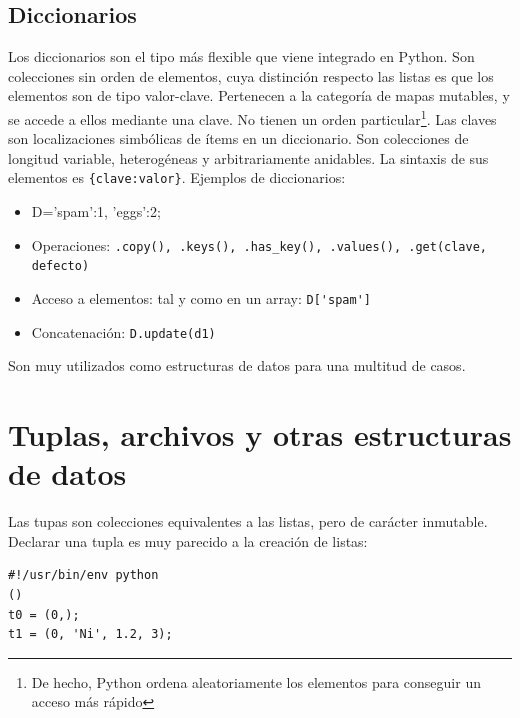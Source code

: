 \documentclass[12pt]{article} %
\begin{document}
\subsection{Diccionarios}
Los diccionarios son el tipo más flexible que viene integrado en Python. Son colecciones sin orden de elementos, cuya distinción respecto las listas es que los elementos son de tipo valor-clave. Pertenecen a la categoría de mapas mutables, y se accede a ellos mediante una clave. No tienen un orden particular\footnote{De hecho, Python ordena aleatoriamente los elementos para conseguir un acceso más rápido}. Las claves son localizaciones simbólicas de ítems en un diccionario.
Son colecciones de longitud variable, heterogéneas y arbitrariamente anidables.
La sintaxis de sus elementos es \verb+{clave:valor}+. Ejemplos de diccionarios:
\begin{itemize}
	\item D={'spam':1, 'eggs':2};
	\item Operaciones: \verb+.copy(), .keys(), .has_key(), .values(), .get(clave, defecto)+
	\item Acceso a elementos: tal y como en un array: \verb+D['spam']+
	\item Concatenación: \verb+D.update(d1)+
\end{itemize}
Son muy utilizados como estructuras de datos para una multitud de casos.

\section{Tuplas, archivos y otras estructuras de datos}
Las tupas son colecciones equivalentes a las listas, pero de carácter inmutable. Declarar una tupla es muy parecido a la creación de listas:
\begin{lstlisting}[frame=single, showspaces=false]
#!/usr/bin/env python
() 
t0 = (0,);
t1 = (0, 'Ni', 1.2, 3);
\end{lstlisting}
\newpage
\end{document}
